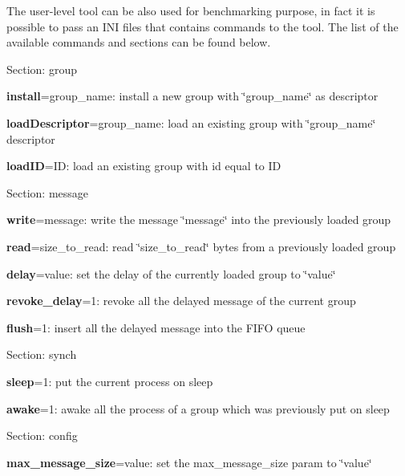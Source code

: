 The user-\/level tool can be also used for benchmarking purpose, in fact it is possible to pass an I\+NI files that contains commands to the tool. The list of the available commands and sections can be found below. ~\newline



\begin{DoxyItemize}
\item Section\+: group
\begin{DoxyEnumerate}
\item {\bfseries{install}}=group\+\_\+name\+: install a new group with \char`\"{}group\+\_\+name\char`\"{} as descriptor
\item {\bfseries{load\+Descriptor}}=group\+\_\+name\+: load an existing group with \char`\"{}group\+\_\+name\char`\"{} descriptor
\item {\bfseries{load\+ID}}=ID\+: load an existing group with id equal to ID
\end{DoxyEnumerate}
\item Section\+: message
\begin{DoxyEnumerate}
\item {\bfseries{write}}=message\+: write the message \char`\"{}message\char`\"{} into the previously loaded group
\item {\bfseries{read}}=size\+\_\+to\+\_\+read\+: read \char`\"{}size\+\_\+to\+\_\+read\char`\"{} bytes from a previously loaded group
\item {\bfseries{delay}}=value\+: set the delay of the currently loaded group to \char`\"{}value\char`\"{}
\item {\bfseries{revoke\+\_\+delay}}=1\+: revoke all the delayed message of the current group
\item {\bfseries{flush}}=1\+: insert all the delayed message into the F\+I\+FO queue
\end{DoxyEnumerate}
\item Section\+: synch
\begin{DoxyEnumerate}
\item {\bfseries{sleep}}=1\+: put the current process on sleep
\item {\bfseries{awake}}=1\+: awake all the process of a group which was previously put on sleep
\end{DoxyEnumerate}
\item Section\+: config
\begin{DoxyEnumerate}
\item {\bfseries{max\+\_\+message\+\_\+size}}=value\+: set the \textquotesingle{}max\+\_\+message\+\_\+size\textquotesingle{} param to \char`\"{}value\char`\"{}

\end{DoxyEnumerate}
\end{DoxyItemize}
